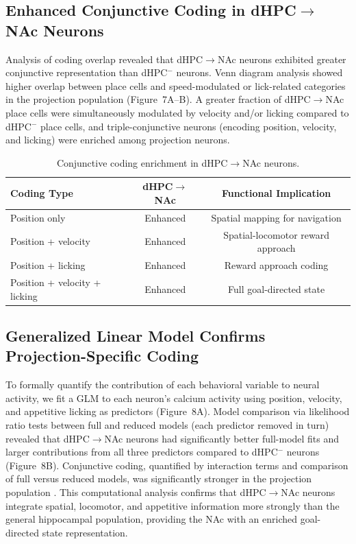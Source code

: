 \documentclass[11pt]{article}
\begin{document}
\subsection{Enhanced Conjunctive Coding in dHPC$\to$NAc Neurons}

Analysis of coding overlap revealed that dHPC$\to$NAc neurons exhibited greater conjunctive representation than dHPC$^-$ neurons. Venn diagram analysis showed higher overlap between place cells and speed-modulated or lick-related categories in the projection population (Figure~7A--B). A greater fraction of dHPC$\to$NAc place cells were simultaneously modulated by velocity and/or licking compared to dHPC$^-$ place cells, and triple-conjunctive neurons (encoding position, velocity, and licking) were enriched among projection neurons.

\begin{table}[H]
\centering
\caption{Conjunctive coding enrichment in dHPC$\to$NAc neurons.}
\label{tab:conjunctive}
\begin{tabular}{lcc}
\toprule
Coding Type & dHPC$\to$NAc & Functional Implication \\
\midrule
Position only & Enhanced & Spatial mapping for navigation \\
Position + velocity & Enhanced & Spatial-locomotor reward approach \\
Position + licking & Enhanced & Reward approach coding \\
Position + velocity + licking & Enhanced & Full goal-directed state \\
\bottomrule
\end{tabular}
\end{table}

\subsection{Generalized Linear Model Confirms Projection-Specific Coding}

To formally quantify the contribution of each behavioral variable to neural activity, we fit a GLM to each neuron's calcium activity using position, velocity, and appetitive licking as predictors (Figure~8A). Model comparison via likelihood ratio tests between full and reduced models (each predictor removed in turn) revealed that dHPC$\to$NAc neurons had significantly better full-model fits and larger contributions from all three predictors compared to dHPC$^-$ neurons (Figure~8B). Conjunctive coding, quantified by interaction terms and comparison of full versus reduced models, was significantly stronger in the projection population \citep{Hardcastle2017,Leutgeb2005}. This computational analysis confirms that dHPC$\to$NAc neurons integrate spatial, locomotor, and appetitive information more strongly than the general hippocampal population, providing the NAc with an enriched goal-directed state representation.
\end{document}
